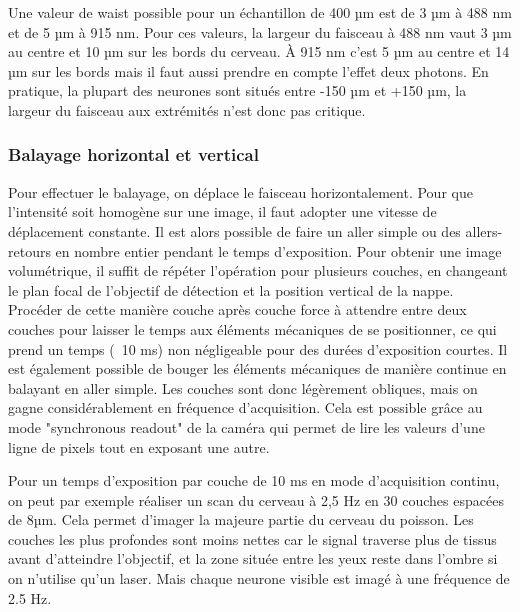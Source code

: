 Une valeur de waist possible pour un échantillon de 400 µm est de 3 µm à 488 nm et de 5 µm à 915 nm. Pour ces valeurs, la largeur du faisceau à 488 nm vaut 3 µm au centre et 10 µm sur les bords du cerveau. À 915 nm c'est 5 µm au centre et 14 µm sur les bords mais il faut aussi prendre en compte l'effet deux photons. En pratique, la plupart des neurones sont situés entre -150 µm et +150 µm, la largeur du faisceau aux extrémités n'est donc pas critique.

\subsubsection{Balayage horizontal et vertical}

Pour effectuer le balayage, on déplace le faisceau horizontalement. Pour que l'intensité soit homogène sur une image, il faut adopter une vitesse de déplacement constante. Il est alors possible de faire un aller simple ou des allers-retours en nombre entier pendant le temps d'exposition. Pour obtenir une image volumétrique, il suffit de répéter l'opération pour plusieurs couches, en changeant le plan focal de l'objectif de détection et la position vertical de la nappe. Procéder de cette manière couche après couche force à attendre entre deux couches pour laisser le temps aux éléments mécaniques de se positionner, ce qui prend un temps (~10 ms) non négligeable pour des durées d'exposition courtes. Il est également possible de bouger les éléments mécaniques de manière continue en balayant en aller simple. Les couches sont donc légèrement obliques, mais on gagne considérablement en fréquence d'acquisition. Cela est possible grâce au mode "synchronous readout" de la caméra qui permet de lire les valeurs d'une ligne de pixels tout en exposant une autre.

Pour un temps d'exposition par couche de 10 ms en mode d'acquisition continu, on peut par exemple réaliser un scan du cerveau à 2,5 Hz en 30 couches espacées de 8µm. Cela permet d'imager la majeure partie du cerveau du poisson. Les couches les plus profondes sont moins nettes car le signal traverse plus de tissus avant d'atteindre l'objectif, et la zone située entre les yeux reste dans l'ombre si on n'utilise qu'un laser. Mais chaque neurone visible est imagé à une fréquence de 2.5 Hz.






